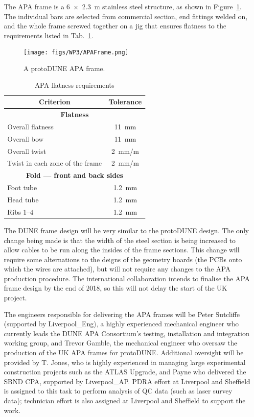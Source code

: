 The APA frame is a \SI{6x2.3}{\metre} stainless steel structure, as shown in Figure~\ref{fig:APAFrame}. The individual bars are selected from commercial section, end fittings welded on, and the whole frame screwed together on a jig that ensures flatness to the requirements listed in Tab.~\ref{tab:APAFlatness}.

\begin{figure}
    \centering
    \texttt{[image: figs/WP3/APAFrame.png]}
    \caption{A protoDUNE APA frame.}
    \label{fig:APAFrame}
\end{figure}

\begin{table}
\centering
\begin{tabular}{|l|c|}
\hline
    \multicolumn{1}{|c|}{\bf Criterion} & {\bf Tolerance} \\ \hline
    \multicolumn{2}{|c|}{\bf Flatness}\\
    Overall flatness & \SI{11}{\milli\metre} \\
    Overall bow & \SI{11}{\milli\metre}\\
    Overall twist & \SI{2}{\milli\metre / \metre}\\
    Twist in each zone of the frame & \SI{2}{\milli\metre / \metre}\\ \hline
    \multicolumn{2}{|c|}{\bf Fold --- front and back sides}\\
    Foot tube & \SI{1.2}{\milli\metre}\\
    Head tube & \SI{1.2}{\milli\metre}\\
    Ribs 1--4 & \SI{1.2}{\milli\metre}\\
    \hline
\end{tabular}
\caption{APA flatness requirements}
\label{tab:APAFlatness}
\end{table}

The DUNE frame design will be very similar to the protoDUNE design. The only change being made is that the width of the steel section is being increased to allow cables to be run along the insides of the frame sections. This change will require some alternations to the deigns of the geometry boards (the PCBs onto which the wires are attached), but will not require any changes to the APA production procedure. The international collaboration intends to finalise the APA frame design by the end of 2018, so this will not delay the start of the UK project.

The engineers responsible for delivering the APA frames will be Peter Sutcliffe (supported by Liverpool\_Eng), a highly experienced mechanical engineer who currently leads the DUNE APA Consortium's testing, installation and integration working group, and Trevor Gamble, the mechanical engineer who oversaw the production of the UK APA frames for protoDUNE. Additional oversight will be provided by T. Jones, who is highly experienced in managing large experimental construction projects such as the ATLAS Upgrade, and Payne who delivered the SBND CPA, supported by Liverpool\_AP. PDRA effort at Liverpool and Sheffield is assigned to this task to perform analysis of QC data (such as laser survey data); technician effort is also assigned at Liverpool and Sheffield to support the work.

